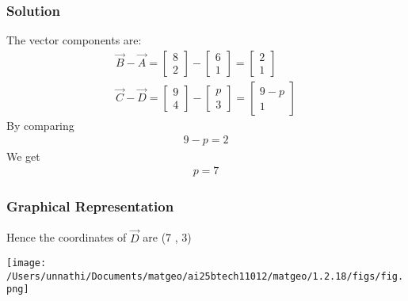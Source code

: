 \documentclass{beamer}
\begin{document}
\begin{frame}
\frametitle{Solution}
The vector components are:
\begin{align}
	\vec{B} - \vec{A} =\begin{bmatrix}8 \\ 2\end{bmatrix} - \begin{bmatrix}6 \\ 1\end{bmatrix} = \begin{bmatrix}2 \\ 1\end{bmatrix}\\
		\vec{C} - \vec{D} =\begin{bmatrix}9 \\ 4\end{bmatrix} - \begin{bmatrix}p \\ 3\end{bmatrix} = \begin{bmatrix}9-p \\ 1\end{bmatrix}
\end{align}
By comparing 
\begin{align}
    9-p = 2
\end{align}
We get 
\begin{align}
    p = 7
\end{align}

\end{frame}

\begin{frame}
\frametitle{Graphical Representation}
	Hence the coordinates of $\vec{D}$ are (7 , 3)
\begin{center}
\texttt{[image: /Users/unnathi/Documents/matgeo/ai25btech11012/matgeo/1.2.18/figs/fig.png]}
\end{center}
\end{frame}
\end{document}
